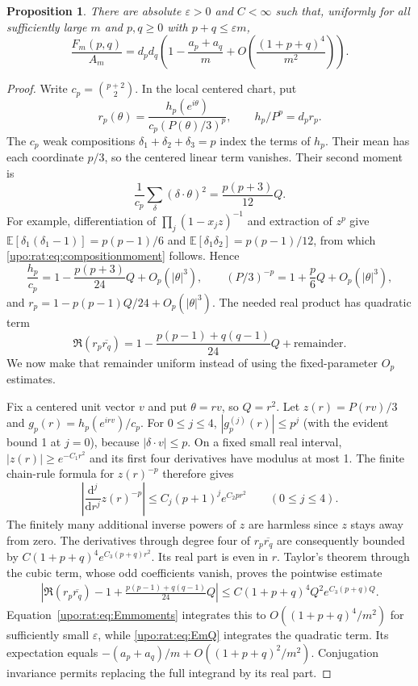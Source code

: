 \documentclass[11pt,letterpaper]{article}
\newtheorem{proposition}[theorem]{Proposition}
\theoremstyle{remark}\newtheorem{remark}[theorem]{Remark}
\numberwithin{equation}{section}
\newcommand{\E}{\mathbb E}
\begin{document}
\begin{proposition}\label{upo:rat:prop:boundary}
There are absolute $\varepsilon>0$ and $C<\infty$ such that, uniformly
for all sufficiently large $m$ and $p,q\ge0$ with $p+q\le\varepsilon m$,
\begin{equation}\label{upo:rat:eq:Fexp}
\frac{F_m(p,q)}{A_m}=d_pd_q\left(1-\frac{a_p+a_q}{m}
+O\left(\frac{(1+p+q)^4}{m^2}\right)\right).
\end{equation}
\end{proposition}
\begin{proof}
Write $c_p=\binom{p+2}{2}$. In the local centered chart, put
\[
r_p(\theta)=\frac{h_p(e^{i\theta})}{c_p(P(\theta)/3)^p},
\qquad h_p/P^p=d_pr_p.
\]
The $c_p$ weak compositions $\delta_1+\delta_2+\delta_3=p$ index the
terms of $h_p$. Their mean has each coordinate $p/3$, so the centered
linear term vanishes. Their second moment is
\begin{equation}\label{upo:rat:eq:compositionmoment}
\frac1{c_p}\sum_\delta(\delta\cdot\theta)^2
=\frac{p(p+3)}{12}Q.
\end{equation}
For example, differentiation of $\prod_j(1-x_jz)^{-1}$ and extraction
of $z^p$ give
$\E[\delta_1(\delta_1-1)]=p(p-1)/6$ and
$\E[\delta_1\delta_2]=p(p-1)/12$, from which
\eqref{upo:rat:eq:compositionmoment} follows. Hence
\[
\frac{h_p}{c_p}=1-\frac{p(p+3)}{24}Q+O_p(|\theta|^3),
\qquad (P/3)^{-p}=1+\frac p6Q+O_p(|\theta|^3),
\]
and $r_p=1-p(p-1)Q/24+O_p(|\theta|^3)$.
The needed real product has quadratic term
\begin{equation}\label{upo:rat:eq:rquad}
\Re(r_p\overline{r_q})
=1-\frac{p(p-1)+q(q-1)}{24}Q+\text{remainder}.
\end{equation}
We now make that remainder uniform instead of using the fixed-parameter
$O_p$ estimates.

Fix a centered unit vector $v$ and put $\theta=rv$, so $Q=r^2$.
Let $z(r)=P(rv)/3$ and $g_p(r)=h_p(e^{irv})/c_p$.
For $0\le j\le4$, $|g_p^{(j)}(r)|\le p^j$ (with the evident bound 1
at $j=0$), because $|\delta\cdot v|\le p$.
On a fixed small real interval, $|z(r)|\ge e^{-C_1r^2}$ and its first
four derivatives have modulus at most 1. The finite chain-rule formula
for $z(r)^{-p}$ therefore gives
\[
\left|\frac{\mathrm d^j}{\mathrm dr^j}z(r)^{-p}\right|
\le C_j(p+1)^j e^{C_2pr^2}\qquad(0\le j\le4).
\]
The finitely many additional inverse powers of $z$ are harmless since
$z$ stays away from zero. The derivatives through degree four of
$r_p\overline{r_q}$ are consequently bounded by
$C(1+p+q)^4e^{C_3(p+q)r^2}$. Its real part is even in $r$.
Taylor's theorem through the cubic term, whose odd coefficients vanish,
proves the pointwise estimate
\begin{align}\label{upo:rat:eq:uniformremainder}
\left|\Re(r_p\overline{r_q})-1+
\frac{p(p-1)+q(q-1)}{24}Q\right|
\le C(1+p+q)^4Q^2e^{C_3(p+q)Q}.
\end{align}
Equation~\eqref{upo:rat:eq:Emmoments} integrates this to
$O((1+p+q)^4/m^2)$ for sufficiently small $\varepsilon$, while
\eqref{upo:rat:eq:EmQ} integrates the quadratic term. Its expectation equals
$-(a_p+a_q)/m+O((1+p+q)^2/m^2)$.
Conjugation invariance permits replacing the full integrand by its
real part.


\end{proof}
\end{document}
